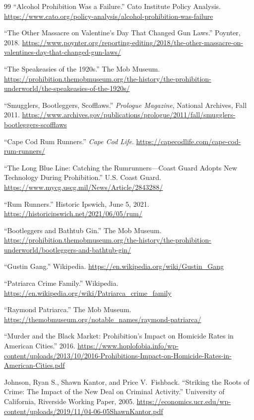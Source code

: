 \documentclass[12pt,openany]{book}
\begin{document}
\begin{thebibliography}{99}
``Alcohol Prohibition Was a Failure.'' Cato Institute Policy Analysis. \url{https://www.cato.org/policy-analysis/alcohol-prohibition-was-failure}

``The Other Massacre on Valentine's Day That Changed Gun Laws.'' Poynter, 2018. \url{https://www.poynter.org/reporting-editing/2018/the-other-massacre-on-valentines-day-that-changed-gun-laws/}

``The Speakeasies of the 1920s.'' The Mob Museum. \url{https://prohibition.themobmuseum.org/the-history/the-prohibition-underworld/the-speakeasies-of-the-1920s/}

``Smugglers, Bootleggers, Scofflaws.'' \textit{Prologue Magazine}, National Archives, Fall 2011. \url{https://www.archives.gov/publications/prologue/2011/fall/smugglers-bootleggers-scofflaws}

``Cape Cod Rum Runners.'' \textit{Cape Cod Life}. \url{https://capecodlife.com/cape-cod-rum-runners/}

``The Long Blue Line: Catching the Rumrunners---Coast Guard Adopts New Technology During Prohibition.'' U.S. Coast Guard. \url{https://www.mycg.uscg.mil/News/Article/2843288/}

``Rum Runners.'' Historic Ipswich, June 5, 2021. \url{https://historicipswich.net/2021/06/05/rum/}

``Bootleggers and Bathtub Gin.'' The Mob Museum. \url{https://prohibition.themobmuseum.org/the-history/the-prohibition-underworld/bootleggers-and-bathtub-gin/}

``Gustin Gang.'' Wikipedia. \url{https://en.wikipedia.org/wiki/Gustin_Gang}

``Patriarca Crime Family.'' Wikipedia. \url{https://en.wikipedia.org/wiki/Patriarca_crime_family}

``Raymond Patriarca.'' The Mob Museum. \url{https://themobmuseum.org/notable_names/raymond-patriarca/}

``Murder and the Black Market: Prohibition's Impact on Homicide Rates in American Cities.'' 2016. \url{https://www.hoplofobia.info/wp-content/uploads/2013/10/2016-Prohibitions-Impact-on-Homicide-Rates-in-American-Cities.pdf}

Johnson, Ryan S., Shawn Kantor, and Price V.\ Fishback. ``Striking the Roots of Crime: The Impact of the New Deal on Criminal Activity.'' University of California, Riverside Working Paper, 2005. \url{https://economics.ucr.edu/wp-content/uploads/2019/11/04-06-05ShawnKantor.pdf}


\end{thebibliography}
\end{document}

